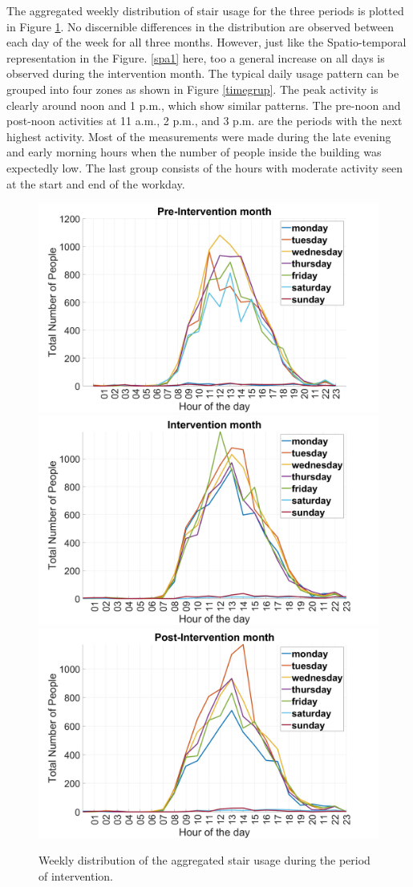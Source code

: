The aggregated weekly distribution of stair usage for the three periods is plotted in Figure \ref{spa2}. No discernible differences in the distribution are observed between each day of the week for all three months. However, just like the Spatio-temporal representation in the Figure. \ref{spa1} here, too a general increase on all days is observed during the intervention month. The typical daily usage pattern can be grouped into four zones as shown in Figure \ref{timegrup}. The peak activity is clearly around noon and 1 p.m., which show similar patterns. The pre-noon and post-noon activities at 11 a.m., 2 p.m., and 3 p.m. are the periods with the next highest activity. Most of the measurements were made during the late evening and early morning hours when the number of people inside the building was expectedly low. The last group consists of the hours with moderate activity seen at the start and end of the workday. 



\begin{figure}[htbp]
    \includegraphics[width=.5\textwidth]{image/aggWeekPre.jpg}\hfill
    \includegraphics[width=.5\textwidth]{image/aggWeekInt.jpg}\hfill\centering
    \includegraphics[width=.5\textwidth]{image/aggWeekPost.jpg}
    \\[\smallskipamount]
    \caption{Weekly distribution of the aggregated stair usage during the period of intervention.}
    \label{spa2}
\end{figure}




